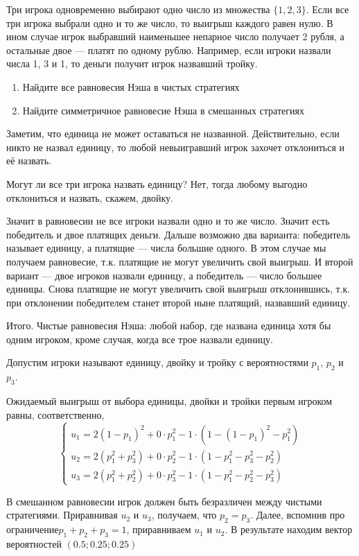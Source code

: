 \begin{problem}
Три игрока одновременно выбирают одно число из множества $\{1,2,3\}$. Если все три игрока выбрали одно и то же число, то выигрыш каждого равен нулю. В ином случае игрок выбравший наименьшее непарное число получает 2 рубля, а остальные двое --- платят по одному рублю. Например, если игроки назвали числа 1, 3 и 1, то деньги получит игрок назвавший тройку.
\begin{enumerate}
\item  Найдите все равновесия Нэша в чистых стратегиях
\item  Найдите симметричное равновесие Нэша в смешанных стратегиях
\end{enumerate}


\begin{sol}
Заметим, что единица не может оставаться не названной. Действительно, если никто не назвал единицу, то любой невыигравший игрок захочет отклониться и её назвать.

Могут ли все три игрока назвать единицу? Нет, тогда любому выгодно отклониться и назвать, скажем, двойку.

Значит в равновесии не все игроки назвали одно и то же число. Значит есть победитель и двое платящих деньги.  Дальше возможно два варианта: победитель называет единицу, а платящие --- числа большие одного. В этом случае мы получаем равновесие, т.к. платящие не могут увеличить свой выигрыш. И второй вариант --- двое игроков назвали единицу, а победитель --- число большее единицы. Снова платящие не могут увеличить свой выигрыш отклонившись, т.к. при отклонении победителем станет второй ныне платящий, назвавший единицу.

Итого. Чистые равновесия Нэша: любой набор, где названа единица хотя бы одним игроком, кроме случая, когда все трое назвали единицу.

Допустим игроки называют единицу, двойку и тройку с вероятностями $p_1$, $p_2$ и $p_3$.

Ожидаемый выигрыш от выбора единицы, двойки и тройки первым игроком равны, соответственно,
\[
\begin{cases}
u_1= 2(1-p_1)^2+0\cdot p_1^2-1\cdot (1-(1-p_1)^2-p_1^2) \\
u_2 = 2(p_1^2+p_3^2)+0\cdot p_2^2-1\cdot (1-p_1^2-p_3^2-p_2^2) \\
u_3= 2(p_1^2+p_2^2)+0\cdot p_3^2-1\cdot(1-p_1^2-p_2^2-p_3^2)
\end{cases}
\]

В смешанном равновесии игрок должен быть безразличен между чистыми стратегиями. Приравнивая $u_2$ и $u_3$, получаем, что $p_2=p_3$. Далее, вспомнив про ограничение$p_1+p_2+p_3=1$, приравниваем $u_1$ и $u_2$. В результате находим вектор вероятностей  $(0.5;0.25;0.25)$
\end{sol}
\end{problem}

